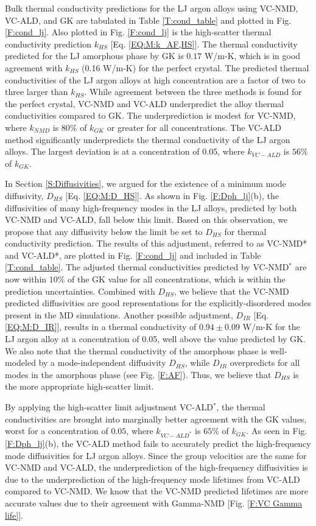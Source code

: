 Bulk thermal conductivity predictions for the LJ argon alloys using  
VC-NMD, VC-ALD, and GK are tabulated in Table \ref{T:cond_table} 
and plotted in Fig. \ref{F:cond_lj}. Also plotted 
in Fig. \ref{F:cond_lj} is the high-scatter   
thermal conductivity prediction $k_{HS}$ 
[Eq. \eqref{EQ:M:k_AF,HS}]. The thermal conductivity predicted 
for the LJ amorphous phase by GK is $0.17$ W/m-K,  
which is in good agreement with $k_{HS}$ (0.16 W/m-K) for the 
perfect crystal.  
The predicted thermal conductivities of the LJ argon alloys at high 
concentration are a factor of two to three larger than $k_{HS}$.  
While agreement between the three methods is found for the perfect 
crystal, VC-NMD and VC-ALD underpredict the alloy thermal 
conductivities compared to GK. 
The underprediction is modest for VC-NMD, where $k_{NMD}$ is 
$80\%$ of $k_{GK}$ or greater for all concentrations. The VC-ALD method 
significantly underpredicts the thermal conductivity of the LJ argon alloys. 
The largest deviation is at a concentration of 0.05, where 
$k_{VC-ALD}$ is $56\%$ of $k_{GK}$.

In Section \ref{S:Diffusivities}, 
we argued for the existence of a minimum mode 
diffusivity, $D_{HS}$ [Eq. \eqref{EQ:M:D_HS}]. 
As shown in Fig. \ref{F:Dph_lj}(b), the diffusivities of 
many high-frequency modes in the LJ alloys, predicted by both VC-NMD 
and VC-ALD, fall below this limit.  Based on this observation, we propose 
that any diffusivity below the limit be set to $D_{HS}$ 
for thermal conductivity prediction. 
The results of this adjustment, 
referred to as VC-NMD* and VC-ALD*, are plotted in Fig. \ref{F:cond_lj} 
and included in Table \ref{T:cond_table}.  
The adjusted thermal conductivities predicted by VC-NMD$^*$ are now  
within $10\%$ of the GK value for all concentrations, which
is within the prediction uncertainties. 
Combined with $D_{HS}$, we believe that the VC-NMD predicted 
diffusivities are good representations for the explicitly-disordered 
modes present in the MD simulations. Another possible 
adjustment, $D_{IR}$ [Eq. \eqref{EQ:M:D_IR}], results in a thermal 
conductivity of $0.94 \pm 0.09$ W/m-K for the LJ argon alloy at a 
concentration of 0.05, well above the value predicted by GK. 
We also note that the thermal 
conductivity of the amorphous phase is well-modeled by a mode-independent 
diffusivity $D_{HS}$, while $D_{IR}$ overpredicts for all modes in the 
amorphous phase (see Fig. \ref{F:AF}). 
Thus, we believe that $D_{HS}$ is the more appropriate high-scatter limit. 

By applying the high-scatter limit adjustment VC-ALD$^*$, the thermal 
conductivities are brought into marginally better agreement with 
the GK values, worst for a concentration of $0.05$, where 
$k_{VC-ALD^*}$ is $65\%$ of $ k_{GK}$.  
As seen in Fig. \ref{F:Dph_lj}(b), the VC-ALD method fails to 
accurately predict the high-frequency mode diffusivities for 
LJ argon alloys. Since the group velocities are the same for 
VC-NMD and VC-ALD, the underprediction of the high-frequency 
diffusivities is
due to the underprediction of the high-frequency 
mode lifetimes from VC-ALD compared to VC-NMD. We know that the 
VC-NMD predicted lifetimes are more accurate values due 
to their agreement with Gamma-NMD [Fig. \ref{F:VC Gamma life}]. 

